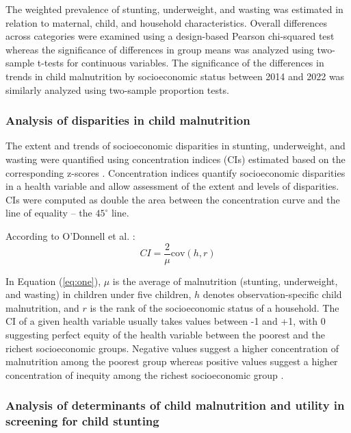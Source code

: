 \documentclass[sn-basic,Numbered,pdflatex]{sn-jnl}
\theoremstyle{remark}
\theoremstyle{definition}
\begin{document}
The weighted prevalence of stunting, underweight, and wasting was
estimated in relation to maternal, child, and household characteristics.
Overall differences across categories were examined using a design-based
Pearson chi-squared test whereas the significance of differences in
group means was analyzed using two-sample t-tests for continuous
variables. The significance of the differences in trends in child
malnutrition by socioeconomic status between 2014 and 2022 was similarly
analyzed using two-sample proportion tests.

\hypertarget{analysis-of-disparities-in-child-malnutrition}{%
\subsubsection{Analysis of disparities in child
malnutrition}\label{analysis-of-disparities-in-child-malnutrition}}

The extent and trends of socioeconomic disparities in stunting,
underweight, and wasting were quantified using concentration indices
(CIs) estimated based on the corresponding z-scores
\citep{odonnell_analyzing_2008, Wagstaff1991, Wagstaff2000}.
Concentration indices quantify socioeconomic disparities in a health
variable and allow assessment of the extent and levels of disparities.
CIs were computed as double the area between the concentration curve and
the line of equality -- the \(45^{\circ}\) line.

According to O'Donnell et al. \citep{odonnell_analyzing_2008}:
\begin{equation}
CI = \frac{2}{\mu} \textrm{cov}(h, r)
\label{eq:one}
\end{equation}

In Equation (\ref{eq:one}), \(\mu\) is the average of malnutrition
(stunting, underweight, and wasting) in children under five children,
\(h\) denotes observation-specific child malnutrition, and \(r\) is the
rank of the socioeconomic status of a household. The CI of a given
health variable usually takes values between -1 and +1, with 0
suggesting perfect equity of the health variable between the poorest and
the richest socioeconomic groups. Negative values suggest a higher
concentration of malnutrition among the poorest group whereas positive
values suggest a higher concentration of inequity among the richest
socioeconomic group
\citep{Akombi2019, jonah2018, kien_trends_2016, Wagstaff2000}.

\hypertarget{analysis-of-determinants-of-child-malnutrition-and-utility-in-screening-for-child-stunting}{%
\subsubsection{Analysis of determinants of child malnutrition and
utility in screening for child
stunting}\label{analysis-of-determinants-of-child-malnutrition-and-utility-in-screening-for-child-stunting}}
\end{document}
